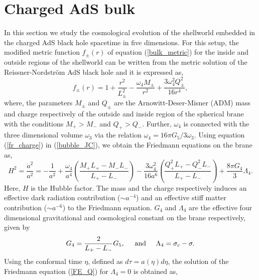 \documentclass[12pt]{article}
\begin{document}
\section{Charged AdS bulk}\label{sec3}
In this section we study the cosmological evolution of the shellworld embedded in the charged AdS black hole spacetime in five dimensions. For this setup, the modified metric function $f_{\pm}(r)$ of equation (\ref{bulk_metric}) for the inside and outside regions of the shellworld can be written from the metric solution of the Reissner-Nordstr\"om AdS black hole \cite{Chamblin:1999tk} and it is expressed as, 
\begin{equation}\label{fr_charge}
f_{\pm}(r)=1+\frac{r^2}{L_{\pm}^2}-\frac{\omega_4 M_{\pm}}{r^2}+\frac{3\omega^2_4 Q_{\pm}^2}{16 r^4},
\end{equation}
where, the parameters $M_\pm$ and $Q_\pm$ are the Arnowitt-Deser-Misner (ADM) mass and charge respectively of the outside and inside region of the spherical brane with the conditions $M_+ > M_-$ and $Q_+ > Q_-$. Further, $\omega_4$ is connected with the three dimensional volume $\omega_3$ via the relation $\omega_4=16 \pi G_5/3 \omega_3$. Using equation (\ref{fr_charge}) in (\ref{bubble_JC}), we obtain the Friedmann equations on the brane as,
\begin{equation}\label{FE_Q}
	H^2=\frac{\dot{a}^2}{a^2}=-\frac{1}{a^2}+\frac{\omega_4}{a^4}\left(\frac{M_+L_+-M_-L_-}{L_+-L_-}\right)-\frac{3\omega_4^2}{16a^6}\left(\frac{Q_+^2L_+-Q_-^2L_-}{L_+-L_-}\right)+\frac{8\pi G_4 }{3}\Lambda_4.
\end{equation}
Here, $H$ is the Hubble factor. The mass and the charge respectively induces an effective dark radiation contribution ($\sim a^{-4}$) and an effective stiff matter contribution ($\sim a^{-6}$) to the Friedmann equation.  $G_4$ and $\Lambda_4$ are the effective four dimensional gravitational and cosmological constant on the brane respectively, given by
\begin{equation}
G_4=\frac{2}{L_+-L_-}G_5,\hspace{0.5cm}\text{and} \hspace{0.5cm} \Lambda_4=\sigma_{c}-\sigma.
\end{equation}
 Using the conformal time $\eta$, defined as $d\tau=a(\eta)d\eta $, the solution of the Friedmann equation (\ref{FE_Q}) for $\Lambda_4=0$ is obtained as,
\end{document}
